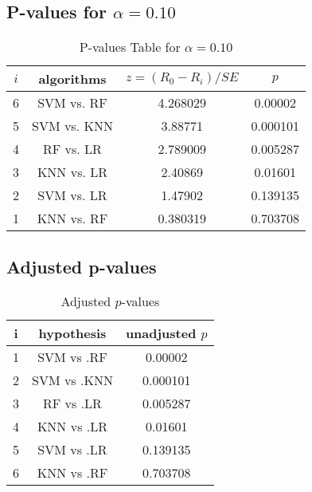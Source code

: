 \documentclass[a4paper,10pt]{article}
\begin{document}
\begin{landscape}
\subsection{P-values for $\alpha=0.10$}

\begin{table}[!htp]
\centering\scriptsize
\begin{tabular}{cccc}
$i$&algorithms&$z=(R_0 - R_i)/SE$&$p$\\
\hline6&SVM vs. RF&4.268029&0.00002\\
5&SVM vs. KNN&3.88771&0.000101\\
4&RF vs. LR&2.789009&0.005287\\
3&KNN vs. LR&2.40869&0.01601\\
2&SVM vs. LR&1.47902&0.139135\\
1&KNN vs. RF&0.380319&0.703708\\
\hline
\end{tabular}
\caption{P-values Table for $\alpha=0.10$}
\end{table}\pagebreak

\subsection{Adjusted p-values}

\begin{table}[!htp]
\centering\scriptsize
\begin{tabular}{ccc}
i&hypothesis&unadjusted $p$\\
\hline1&SVM vs .RF&0.00002\\
2&SVM vs .KNN&0.000101\\
3&RF vs .LR&0.005287\\
4&KNN vs .LR&0.01601\\
5&SVM vs .LR&0.139135\\
6&KNN vs .RF&0.703708\\
\hline
\end{tabular}
\caption{Adjusted $p$-values}
\end{table}

\end{landscape}
\end{document}
